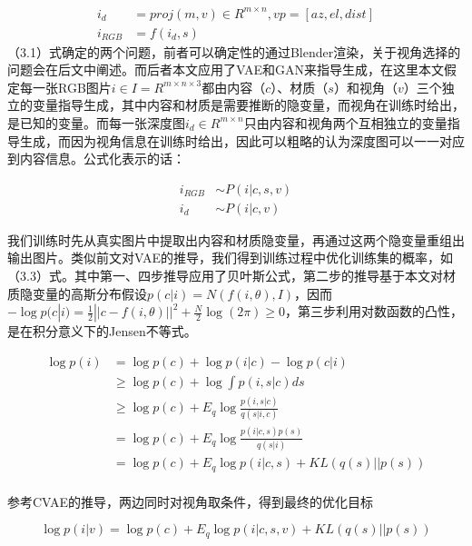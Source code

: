\documentclass[UTF8,openany,AutoFakeBold,AutoFakeSlant,cs4size]{ctexbook}
\begin{document}
\begin{equation}
	\begin{aligned}
		i_{d} &= proj(m, v) \in R^{m \times n}, vp = [az, el, dist] \\
		i_{RGB} &= f(i_{d}, s)
	\end{aligned}
\end{equation}
（3.1）式确定的两个问题，前者可以确定性的通过Blender渲染，关于视角选择的问题会在后文中阐述。而后者本文应用了VAE和GAN来指导生成，在这里本文假定每一张RGB图片$i \in I = R^{m \times n \times 3}$都由内容（$c$）、材质（$s$）和视角（$v$）三个独立的变量指导生成，其中内容和材质是需要推断的隐变量，而视角在训练时给出，是已知的变量。而每一张深度图$i_{d} \in R^{m \times n}$只由内容和视角两个互相独立的变量指导生成，而因为视角信息在训练时给出，因此可以粗略的认为深度图可以一一对应到内容信息。公式化表示的话：

\begin{equation}
	\begin{aligned}
		i_{RGB} &\sim P(i | c, s, v) \\ i_{d} &\sim P(i | c, v)
	\end{aligned}
\end{equation}

我们训练时先从真实图片中提取出内容和材质隐变量，再通过这两个隐变量重组出输出图片。类似前文对VAE的推导，我们得到训练过程中优化训练集的概率，如（3.3）式。其中第一、四步推导应用了贝叶斯公式，第二步的推导基于本文对材质隐变量的高斯分布假设$p(c | i) = N(f(i, \theta), I)$，因而$-\log p(c | i) = \frac{1}{2}||c - f(i, \theta) ||^2 + \frac{N}{2}\log (2\pi) \geq 0$，第三步利用对数函数的凸性，是在积分意义下的Jensen不等式。

\begin{equation}
	\begin{aligned}
		\log p(i) &= \log p(c) + \log p(i | c) - \log p(c | i) \\
		&\geq \log p(c) + \log  \int p(i, s | c) ds \\
		&\geq \log p(c) + E_{q} \log \frac{p(i, s | c)}{q(s | i, c)} \\
		&= \log p(c) + E_{q} \log \frac{p(i | c, s)p(s)}{q(s | i)} \\
		&= \log p(c) + E_{q} \log p(i | c, s) + KL(q(s) || p(s)) \\
	\end{aligned}
\end{equation}

参考CVAE的推导，两边同时对视角取条件，得到最终的优化目标

\begin{equation}
	\log p(i | v)= \log p(c) + E_{q} \log p(i | c, s, v) + KL(q(s) || p(s))
\end{equation}
\end{document}
